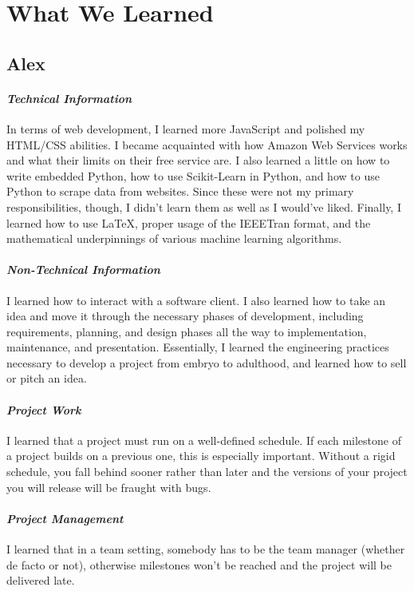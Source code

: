 \documentclass[onecolumn, draftclsnofoot,10pt, compsoc]{IEEEtran}
\begin{document}
\section{What We Learned}
\subsection{Alex}
\paragraph{\emph{Technical Information}}
In terms of web development, I learned more JavaScript and polished my HTML/CSS abilities. I became acquainted with how Amazon Web Services works and what their limits on their free service are. I also learned a little on how to write embedded Python, how to use Scikit-Learn in Python, and how to use Python to scrape data from websites. Since these were not my primary responsibilities, though, I didn't learn them as well as I would've liked. Finally, I learned how to use LaTeX, proper usage of the IEEETran format, and the mathematical underpinnings of various machine learning algorithms.

\paragraph{\emph{Non-Technical Information}}
I learned how to interact with a software client. I also learned how to take an idea and move it through the necessary phases of development, including requirements, planning, and design phases all the way to implementation, maintenance, and presentation. Essentially, I learned the engineering practices necessary to develop a project from embryo to adulthood, and learned how to sell or pitch an idea.
\paragraph{\emph{Project Work}}
I learned that a project must run on a well-defined schedule. If each milestone of a project builds on a previous one, this is especially important. Without a rigid schedule, you fall behind sooner rather than later and the versions of your project you will release will be fraught with bugs. 

\paragraph{\emph{Project Management}}
I learned that in a team setting, somebody has to be the team manager (whether de facto or not), otherwise milestones won't be reached and the project will be delivered late. 
\end{document}
